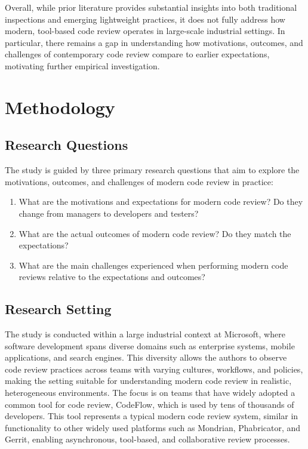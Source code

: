 Overall, while prior literature provides substantial insights into both traditional inspections and emerging lightweight practices, it does not fully address how modern, tool-based code review operates in large-scale industrial settings. In particular, there remains a gap in understanding how motivations, outcomes, and challenges of contemporary code review compare to earlier expectations, motivating further empirical investigation.

\section{Methodology}
\subsection{Research Questions}
The study is guided by three primary research questions that aim to explore the motivations, outcomes, and challenges of modern code review in practice:
\begin{enumerate}
  \item What are the motivations and expectations for modern code review? Do they change from managers to developers and testers?
  \item What are the actual outcomes of modern code review? Do they match the expectations?
  \item What are the main challenges experienced when performing modern code reviews relative to the expectations and outcomes?
\end{enumerate}
\subsection{Research Setting}

The study is conducted within a large industrial context at Microsoft, where software development spans diverse domains such as enterprise systems, mobile applications, and search engines. This diversity allows the authors to observe code review practices across teams with varying cultures, workflows, and policies, making the setting suitable for understanding modern code review in realistic, heterogeneous environments. The focus is on teams that have widely adopted a common tool for code review, CodeFlow, which is used by tens of thousands of developers. This tool represents a typical modern code review system, similar in functionality to other widely used platforms such as Mondrian, Phabricator, and Gerrit, enabling asynchronous, tool-based, and collaborative review processes.

